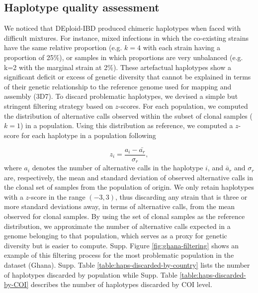 \documentclass[9pt]{article}
\begin{document}





\subsection{Haplotype quality assessment}

We noticed that DEploid-IBD produced chimeric haplotypes when faced with difficult mixtures. For instance, mixed infections in which the co-existing strains have the same relative proportion (e.g. $k=4$ with each strain having a proportion of 25\%), or samples in which proportions are very unbalanced (e.g. k=2 with the marginal strain at 2\%). These artefactual haplotypes show a significant deficit or excess of genetic diversity that cannot be explained in terms of their genetic relationship to the reference genome used for mapping and assembly (3D7). To discard problematic haplotypes, we devised a simple but stringent filtering strategy based on $z$-scores. For each population, we computed the distribution of alternative calls observed within the subset of clonal samples ($k=1$) in a population. Using this distribution as reference, we computed a $z$-score for each haplotype in a population following

$$z_i = \frac{a_i - \bar{a_r}}{\sigma_r},$$ where $a_i$ denotes the number of alternative calls in the haplotype $i$, and $\bar{a}_r$ and $\sigma_r$ are, respectively, the mean and standard deviation of observed alternative calls in the clonal set of samples from the population of origin. We only retain haplotypes with a $z$-score in the range $(-3,3)$, thus discarding any strain that is three or more standard deviations away, in terms of alternative calls, from the mean observed for clonal samples. By using the set of clonal samples as the reference distribution, we approximate the number of alternative calls expected in a genome belonging to that population, which serves as a proxy for genetic diversity but is easier to compute. Supp. Figure \ref{fig:ghana-filtering} shows an example of this filtering process for the most problematic population in the dataset (Ghana). Supp. Table \ref{table:haps-discarded-by-country} lists the number of haplotypes discarded by population while Supp. Table \ref{table:haps-discarded-by-COI} describes the number of haplotypes discarded by COI level.
\end{document}
